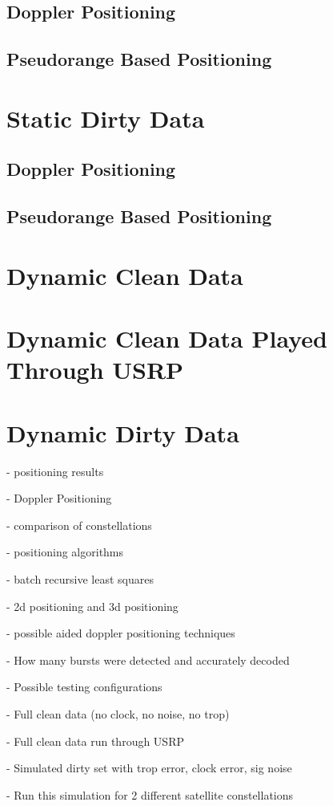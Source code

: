 \documentclass[12pt]{report}
\begin{document}
\subsection{Doppler Positioning}
\subsection{Pseudorange Based Positioning}
\section{Static Dirty Data}
\subsection{Doppler Positioning}
\subsection{Pseudorange Based Positioning}
\section{Dynamic Clean Data}
\section{Dynamic Clean Data Played Through USRP}
\section{Dynamic Dirty Data}
    - positioning results

    - Doppler Positioning 

    - comparison of constellations 

    - positioning algorithms

    - batch recursive least squares

    - 2d positioning and 3d positioning

    - possible aided doppler positioning techniques

    - How many bursts were detected and accurately decoded

    - Possible testing configurations   
        
        - Full clean data (no clock, no noise, no trop)

        - Full clean data run through USRP 

        - Simulated dirty set with trop error, clock error, sig noise

        - Run this simulation for 2 different satellite constellations
\end{document}
